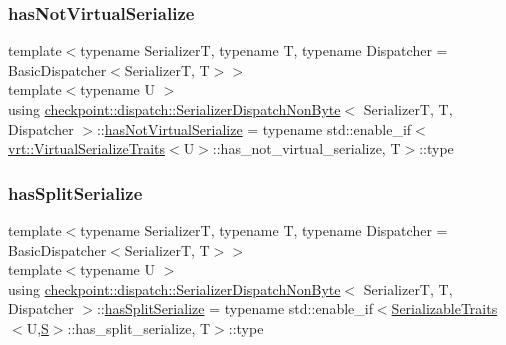 \mbox{\label{structcheckpoint_1_1dispatch_1_1_serializer_dispatch_non_byte_aa9c0d5e9e139a9d922b1ce4adf339465}} 
\subsubsection{\texorpdfstring{has\+Not\+Virtual\+Serialize}{hasNotVirtualSerialize}}
{\footnotesize\ttfamily template$<$typename SerializerT, typename T, typename Dispatcher = Basic\+Dispatcher$<$\+Serializer\+T, T$>$$>$ \\
template$<$typename U $>$ \\
using \hyperlink{structcheckpoint_1_1dispatch_1_1_serializer_dispatch_non_byte}{checkpoint\+::dispatch\+::\+Serializer\+Dispatch\+Non\+Byte}$<$ SerializerT, T, Dispatcher $>$\+::\hyperlink{structcheckpoint_1_1dispatch_1_1_serializer_dispatch_non_byte_aa9c0d5e9e139a9d922b1ce4adf339465}{has\+Not\+Virtual\+Serialize} =  typename std\+::enable\+\_\+if$<$\hyperlink{structcheckpoint_1_1dispatch_1_1vrt_1_1_virtual_serialize_traits}{vrt\+::\+Virtual\+Serialize\+Traits}$<$U$>$\+::has\+\_\+not\+\_\+virtual\+\_\+serialize, T$>$\+::type}

\mbox{\label{structcheckpoint_1_1dispatch_1_1_serializer_dispatch_non_byte_a36fe4f2245004d2daa486a9e47b98b71}} 
\subsubsection{\texorpdfstring{has\+Split\+Serialize}{hasSplitSerialize}}
{\footnotesize\ttfamily template$<$typename SerializerT, typename T, typename Dispatcher = Basic\+Dispatcher$<$\+Serializer\+T, T$>$$>$ \\
template$<$typename U $>$ \\
using \hyperlink{structcheckpoint_1_1dispatch_1_1_serializer_dispatch_non_byte}{checkpoint\+::dispatch\+::\+Serializer\+Dispatch\+Non\+Byte}$<$ SerializerT, T, Dispatcher $>$\+::\hyperlink{structcheckpoint_1_1dispatch_1_1_serializer_dispatch_non_byte_a36fe4f2245004d2daa486a9e47b98b71}{has\+Split\+Serialize} =  typename std\+::enable\+\_\+if$<$\hyperlink{structcheckpoint_1_1_serializable_traits}{Serializable\+Traits}$<$U,\hyperlink{structcheckpoint_1_1dispatch_1_1_serializer_dispatch_non_byte_a456d0c02fc35667989d79ddbb0393776}{S}$>$\+::has\+\_\+split\+\_\+serialize, T$>$\+::type}

